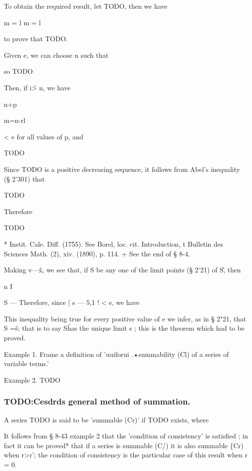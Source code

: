 To obtain the required result, let TODO, then we have

m = l m = l

to prove that TODO.



Given e, we can choose n such that

so TODO

Then, if i\^ > n, we have



n+p


m=n-rl



< e for all values of p, and



TODO

Since TODO is a positive decreasing sequence, it follows
from Abel's inequality (§ 2'301) that

TODO

Therefore

TODO

* Instit. Cale. Diff. (1755). See Borel, loc. cit. Introduction,
t Bulletin des Sciences Math. (2), xiv. (1890), p. 114.
+ See the end of § 8-4.


%
%
Making v—\^x, we see that, if S be any one of the limit points (§ 2'21)
of S\^ , then

n I

S — %
Therefore, since | s — 5,1 ! < e, we have

This inequality being true for every positive value of e we infer, as
in § 2"21, that S =\^s; that is to say S\^ has the unique limit s ;
this is the theorem which had to be proved.

Example 1. Frame a definition of 'uuiforui .•summability (Cl) of a
series of variable terms.'

Example 2. TODO

\subsubsection{TODO:Cesdrds general method of summation.}

A series TODO is said to be 'summable (Cr)' if TODO exists, where

It follows from § 8-43 example 2 that the 'condition of consistency'
is satisfied ; in fact it can be proved* that if a series is summable
(C/) it is also summable \{Cr) when r>r'; the condition of consistency
is the particular case of this result when r = 0.

